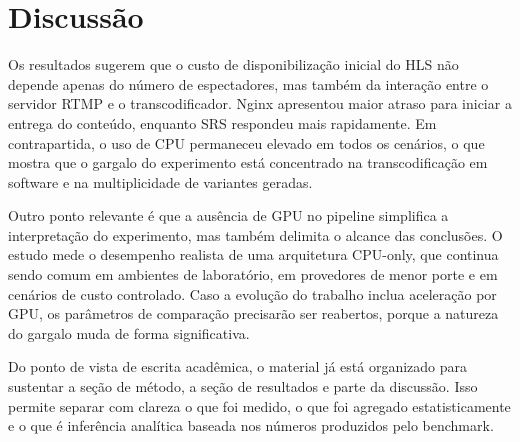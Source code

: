 \section{Discussão}

Os resultados sugerem que o custo de disponibilização inicial do HLS não depende apenas do número de espectadores, mas também da interação entre o servidor RTMP e o transcodificador. Nginx apresentou maior atraso para iniciar a entrega do conteúdo, enquanto SRS respondeu mais rapidamente. Em contrapartida, o uso de CPU permaneceu elevado em todos os cenários, o que mostra que o gargalo do experimento está concentrado na transcodificação em software e na multiplicidade de variantes geradas.

Outro ponto relevante é que a ausência de GPU no pipeline simplifica a interpretação do experimento, mas também delimita o alcance das conclusões. O estudo mede o desempenho realista de uma arquitetura CPU-only, que continua sendo comum em ambientes de laboratório, em provedores de menor porte e em cenários de custo controlado. Caso a evolução do trabalho inclua aceleração por GPU, os parâmetros de comparação precisarão ser reabertos, porque a natureza do gargalo muda de forma significativa.

Do ponto de vista de escrita acadêmica, o material já está organizado para sustentar a seção de método, a seção de resultados e parte da discussão. Isso permite separar com clareza o que foi medido, o que foi agregado estatisticamente e o que é inferência analítica baseada nos números produzidos pelo benchmark.